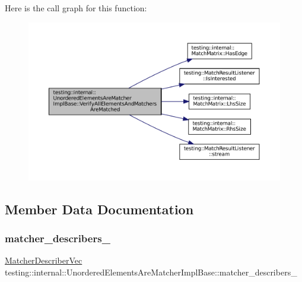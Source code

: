 Here is the call graph for this function\+:
\nopagebreak
\begin{figure}[H]
\begin{center}
\leavevmode
\includegraphics[width=350pt]{classtesting_1_1internal_1_1UnorderedElementsAreMatcherImplBase_a515ec900bd84fe4d28e3ccf55db25822_cgraph}
\end{center}
\end{figure}


\subsection{Member Data Documentation}
\mbox{\label{classtesting_1_1internal_1_1UnorderedElementsAreMatcherImplBase_af416e45f53ebdfe4bccd710142db1600}} 
\subsubsection{\texorpdfstring{matcher\+\_\+describers\+\_\+}{matcher\_describers\_}}
{\footnotesize\ttfamily \hyperlink{classtesting_1_1internal_1_1UnorderedElementsAreMatcherImplBase_a81ca7ce793d4b25ce2a7d3e28b48cd64}{Matcher\+Describer\+Vec} testing\+::internal\+::\+Unordered\+Elements\+Are\+Matcher\+Impl\+Base\+::matcher\+\_\+describers\+\_\+\hspace{0.3cm}{\ttfamily [private]}}



